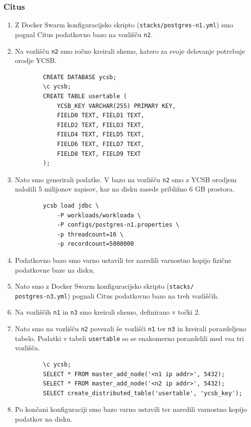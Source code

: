 \documentclass[a4paper, 12pt]{book}
\begin{document}
\subsubsection{Citus}
\begin{enumerate}
    \item Z Docker Swarm konfiguracijsko skripto (\texttt{stacks/postgres-n1.yml}) smo pognal Citus podatkovno bazo na vozlišču \texttt{n2}.
    \item Na vozlišču \texttt{n2} smo ročno kreirali shemo, katero za svoje delovanje potrebuje orodje YCSB.
    \begin{listing}[H]
    \begin{verbatim}
        CREATE DATABASE ycsb;
        \c ycsb;
        CREATE TABLE usertable (
            YCSB_KEY VARCHAR(255) PRIMARY KEY,
            FIELD0 TEXT, FIELD1 TEXT,
            FIELD2 TEXT, FIELD3 TEXT,
            FIELD4 TEXT, FIELD5 TEXT,
            FIELD6 TEXT, FIELD7 TEXT,
            FIELD8 TEXT, FIELD9 TEXT
        );
    \end{verbatim}
    \label{code-ycsb-schema-postgres}
    \end{listing}
    \item Nato smo generirali podatke. V bazo na vozlišču \texttt{n2} smo z YCSB orodjem naložili 5 milijonov zapisov, kar na disku zasede približno 6 GB prostora.
    \begin{listing}[H]
    \begin{verbatim}
        ycsb load jdbc \
            -P workloads/workloada \
            -P configs/postgres-n1.properties \
            -p threadcount=16 \
            -p recordcount=5000000
    \end{verbatim}
    \label{code-ycsb-load-postgres}
    \end{listing}
    \item Podatkovno bazo smo varno ustavili ter naredili varnostno kopijo fizične podatkovne baze na disku.
    \item Nato smo z Docker Swarm konfiguracijsko skripto (\texttt{stacks/\\postgres-n3.yml}) pognali Citus podatkovno bazo na treh vozliščih.
    \item Na vozliščih \texttt{n1} in \texttt{n3} smo kreirali shemo, definirano v točki 2.
    \item Nato smo na vozlišču \texttt{n2} povezali še vozlišči \texttt{n1} ter \texttt{n3} in kreirali porazdeljeno tabelo. Podatki v tabeli \texttt{usertable} so se enakomerno porazdelili med vsa tri vozlišča.
    \begin{listing}[H]
    \begin{verbatim}
        \c ycsb;
        SELECT * FROM master_add_node('<n1 ip addr>', 5432);
        SELECT * FROM master_add_node('<n2 ip addr>', 5432);
        SELECT create_distributed_table('usertable', 'ycsb_key');
    \end{verbatim}
    \label{code-ycsb-add-node-citus}
    \end{listing}
    \item Po končani konfiguraciji smo bazo varno ustavili ter naredili varnostno kopijo podatkov na disku.
\end{enumerate}
\end{document}
